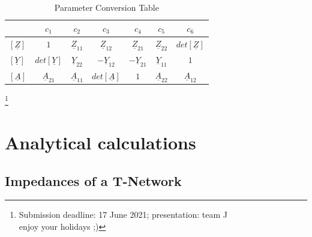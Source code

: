 \documentclass[a4paper]{article}
\renewcommand*{\arraystretch}{1.3}
\newcommand\blfootnote[1]{%
	\begingroup
	\renewcommand\thefootnote{}\footnote{#1}%
	\addtocounter{footnote}{-1}%
	\endgroup
}
\begin{document}
\begin{table}[h]
	\centering
	\renewcommand{\arraystretch}{1.3}
		\begin{tabular}{l||c|c|c|c|c|c}
				& $c_1$& $c_2$& $c_3$& $c_4$& $c_5$& $c_6$ \\ \hline \hline
		$\left[\underline{Z}\right]$ &$ 1 $& $\underline{Z}_{11}$ &$\underline{Z}_{12}$&$\underline{Z}_{21}$&$\underline{Z}_{22}$&$det\left[\underline{Z}\right]$ \\ \hline
	$	\left[\underline{Y}\right]$ &$det\left[\underline{Y}\right]$&$\underline{Y}_{22}$&$-\underline{Y}_{12}$&$-\underline{Y}_{21}$&$\underline{Y}_{11}$&$1$  \\ \hline
	$\left[\underline{A}\right]$ &$\underline{A}_{21} $& $\underline{A}_{11}$ &$det\left[\underline{A}\right]$&$1$&$\underline{A}_{22}$&$\underline{A}_{12}$
		\end{tabular}
	\caption{Parameter Conversion Table}
\end{table}
\blfootnote{Submission deadline: 17 June 2021;  \qquad presentation: team J \\
	 \qquad enjoy your holidays ;)}

\clearpage
\section{Analytical calculations}
\subsection{Impedances of a T-Network}
\end{document}
